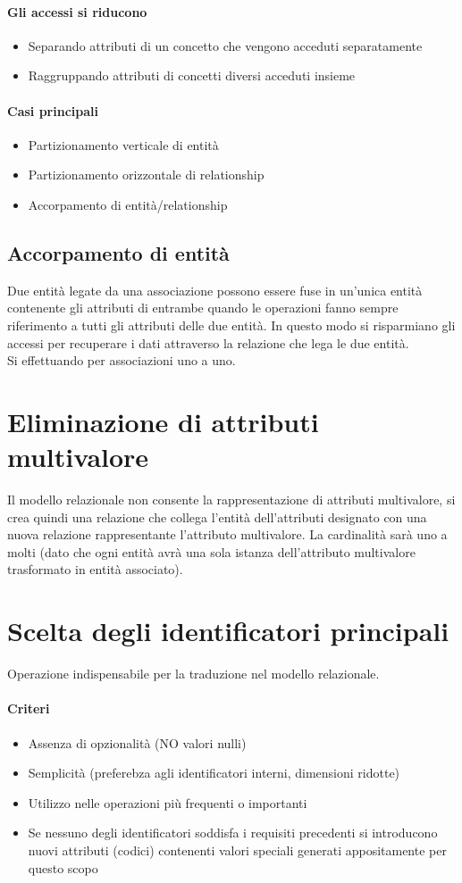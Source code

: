 \paragraph*{Gli accessi si riducono}
\begin{itemize}
    \item Separando attributi di un concetto che vengono acceduti separatamente
    \item Raggruppando attributi di concetti diversi acceduti insieme
\end{itemize}
\paragraph*{Casi principali}
\begin{itemize}
    \item Partizionamento verticale di entità
    \item Partizionamento orizzontale di relationship
    \item Accorpamento di entità/relationship
\end{itemize}
\subsection{Accorpamento di entità}
Due entità legate da una associazione possono essere fuse in un'unica entità
contenente gli attributi di entrambe quando le operazioni fanno sempre riferimento a tutti gli 
attributi delle due entità. In questo modo si risparmiano gli accessi per recuperare i dati
attraverso la relazione che lega le due entità.\\
Si effettuando per associazioni uno a uno.
\section{Eliminazione di attributi multivalore}
Il modello relazionale non consente la rappresentazione di attributi multivalore, si crea quindi
una relazione che collega l'entità dell'attributi designato con una nuova relazione rappresentante 
l'attributo multivalore. La cardinalità sarà uno a molti (dato che ogni entità avrà una sola
istanza dell'attributo multivalore trasformato in entità associato).
\section{Scelta degli identificatori principali}
Operazione indispensabile per la traduzione nel modello relazionale.
\paragraph*{Criteri}
\begin{itemize}
    \item Assenza di opzionalità (NO valori nulli)
    \item Semplicità (preferebza agli identificatori interni, dimensioni ridotte)
    \item Utilizzo nelle operazioni più frequenti o importanti
    \item Se nessuno degli identificatori soddisfa i requisiti precedenti si introducono
    nuovi attributi (codici) contenenti valori speciali generati appositamente per questo scopo
\end{itemize}
